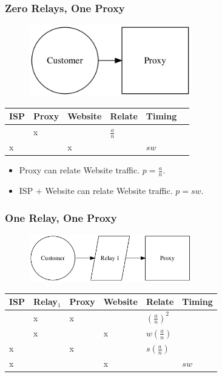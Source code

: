 \documentclass{article}
\begin{document}
\subsubsection{Zero Relays, One Proxy}

\begin{figure}[htbp]
  \centering
  \includegraphics[width = 200pt]{sc}
  \caption{}
\end{figure}

\begin{center}
\begin{tabular}{l | l | l | l | l | l}
  ISP & Proxy & Website & Relate             & Timing \\
  \hline
      & x     &         & $\frac{a}{n}$      & \\
  \hline
  x   &       & x       &                    & $sw$ \\
\end{tabular}
\end{center}

\begin{itemize}
\item Proxy can relate Website traffic. $p = \frac{a}{n}$.
\item ISP + Website can relate Website traffic. $p = sw$.
\end{itemize}

\subsubsection{One Relay, One Proxy}

\begin{figure}[htbp]
  \centering
  \includegraphics[width = 200pt]{stc}
  \caption{}
\end{figure}

\begin{center}
\begin{tabular}{l | l | l | l | l | l}
  ISP & Relay$_1$ & Proxy & Website & Relate             & Timing \\
  \hline
      & x         & x     &         & $(\frac{a}{n})^2$  & \\
  \hline
      & x         &       & x       & $w(\frac{a}{n})$   & \\
  \hline
  x   &           & x     &         & $s(\frac{a}{n})$   & \\
  \hline
  x   &           &       & x       &                    & $sw$ \\
\end{tabular}
\end{center}
\end{document}
